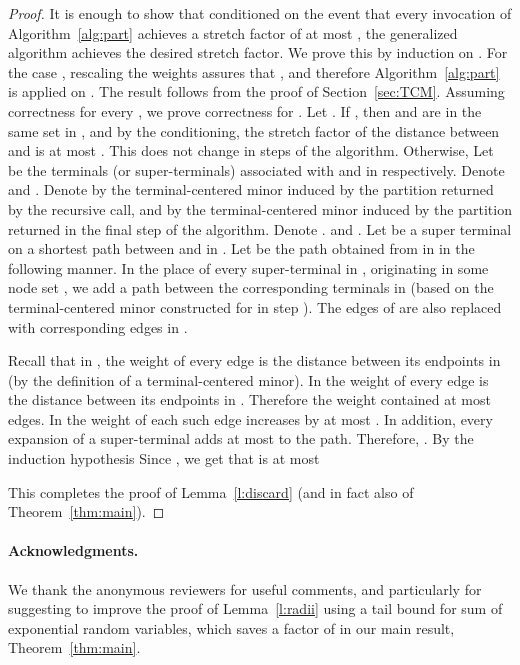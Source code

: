 \documentclass[twoside,leqno,twocolumn]{article}
\begin{document}
\begin{proof}
It is enough to show that conditioned on the event that every invocation of Algorithm~\ref{alg:part} achieves a stretch factor of at most , the generalized algorithm achieves the desired stretch factor.
We prove this by induction on . For the case , rescaling the weights assures that , and therefore Algorithm~\ref{alg:part} is applied on . The result follows from the proof of Section~\ref{sec:TCM}. Assuming correctness for every , we prove correctness for . 
Let . If , then  and  are in the same set in , and by the conditioning, the stretch factor of the distance between  and  is at most . This does not change in steps  of the algorithm.
Otherwise, Let  be the terminals (or super-terminals) associated with  and  in  respectively.
Denote  and . Denote by  the terminal-centered minor induced by the partition returned by the recursive call, and by  the terminal-centered minor induced by the partition returned in the final step of the algorithm. 
Denote . and .
Let  be a super terminal on a shortest path  between  and  in .
Let  be the path obtained from  in  in the following manner. In the place of every super-terminal  in , originating in some node set , we add a path between the corresponding terminals in  (based on the terminal-centered minor constructed for  in step ). The edges of  are also replaced with corresponding edges in .

Recall that in , the weight of every edge is the distance between its endpoints in  (by the definition of a terminal-centered minor). In  the weight of every edge is the distance between its endpoints in . Therefore the weight 
 contained at most  edges. In  the weight of each such edge increases by at most . In addition, every expansion of a super-terminal adds at most  to the path. Therefore, .
By the induction hypothesis  
Since , we get that 
\ifprocs
 is at most

\else

\fi
This completes the proof of Lemma~\ref{l:discard}
(and in fact also of Theorem~\ref{thm:main}).
\end{proof}
\fi

\paragraph{Acknowledgments.}
We thank the anonymous reviewers for useful comments, 
and particularly for suggesting to improve the proof of Lemma~\ref{l:radii}
using a tail bound for sum of exponential random variables, 
which saves a factor of  in our main result, Theorem~\ref{thm:main}.




\end{document}
